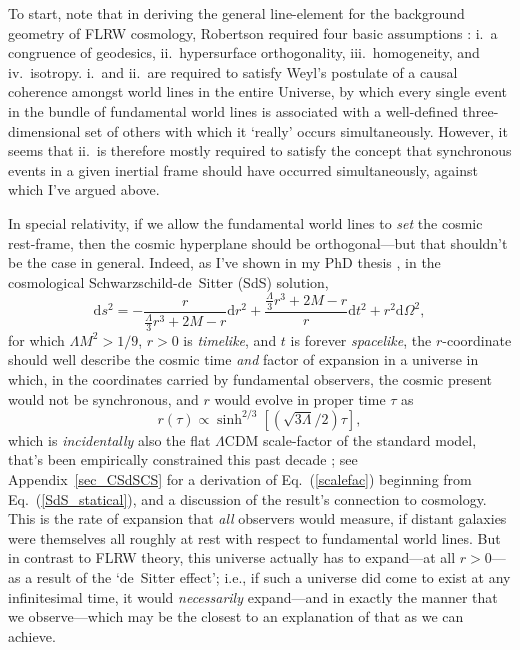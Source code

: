 \documentclass[11pt]{article}
\begin{document}
To start, note that in deriving the general line-element for the background geometry of FLRW cosmology, Robertson required four basic assumptions \cite{Rugh2010}: i.\ a congruence of geodesics, ii.\ hypersurface orthogonality, iii.\ homogeneity, and iv.\ isotropy. i.\ and ii.\ are required to satisfy Weyl's postulate of a causal coherence amongst world lines in the entire Universe, by which every single event in the bundle of fundamental world lines is associated with a well-defined three-dimensional set of others with which it `really' occurs simultaneously. However, it seems that ii.\ is therefore mostly required to satisfy the concept that synchronous events in a given inertial frame should have occurred simultaneously, against which I've argued above.

In special relativity, if we allow the fundamental world lines to \textit{set} the cosmic rest-frame, then the cosmic hyperplane should be orthogonal---but that shouldn't be the case in general. Indeed, as I've shown in my PhD thesis \cite{Janzen2012}, in the cosmological Schwarzschild-de~Sitter (SdS) solution,
\begin{equation}
\mathrm{d}s^2=-\frac{r}{\frac{\Lambda}{3}r^3+2M-r}\mathrm{d}r^2+\frac{\frac{\Lambda}{3}r^3+2M-r}{r}\mathrm{d}t^2+r^2\mathrm{d}\Omega^2,\label{SdS_statical}
\end{equation}
for which ${\Lambda}M^2>1/9$, $r>0$ is \textit{timelike}, and $t$ is forever \textit{spacelike}, the $r$-coordinate should well describe the cosmic time \textit{and} factor of expansion in a universe in which, in the coordinates carried by fundamental observers, the cosmic present would not be synchronous, and $r$ would evolve in proper time $\tau$ as
\begin{equation}
r(\tau)\propto\sinh^{2/3}[(\sqrt{3\Lambda}/2)\tau],\label{scalefac}
\end{equation}
which is \textit{incidentally} also the flat $\Lambda$CDM scale-factor of the standard model, that's been empirically constrained this past decade \cite{SNe Ia}; see Appendix~\ref{sec_CSdSCS} for a derivation of Eq.~(\ref{scalefac}) beginning from Eq.~(\ref{SdS_statical}), and a discussion of the result's connection to cosmology. This is the rate of expansion that \textit{all} observers would measure, if distant galaxies were themselves all roughly at rest with respect to fundamental world lines. But in contrast to FLRW theory, this universe actually has to expand---at all $r>0$---as a result of the `de~Sitter effect'; i.e., if such a universe did come to exist at any infinitesimal time, it would \textit{necessarily} expand---and in exactly the manner that we observe---which may be the closest to an explanation of that as we can achieve.
\end{document}
